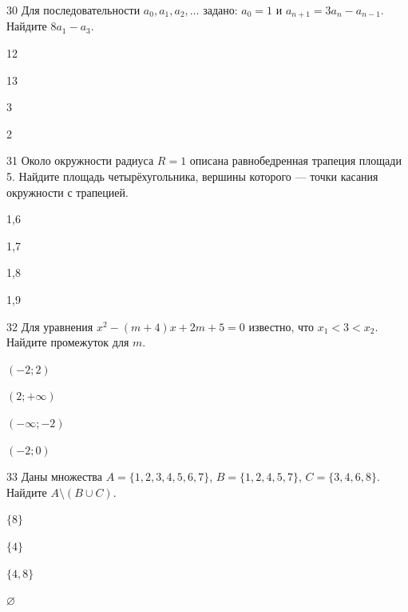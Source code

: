 \documentclass[14pt]{article}
\begin{document}
\begin{questionbox}{30}
    Для последовательности \(a_0, a_1, a_2, \dots\) задано: \(a_0 = 1\) и \(a_{n+1} = 3a_n-a_{n-1}\). Найдите \(8a_1 -a_{3}\).
    \begin{options}
        \item 12
        \item 13
        \item 3
        \item 2
    \end{options}
\end{questionbox}

\begin{questionbox}{31}
    Около окружности радиуса \(R=1\) описана равнобедренная трапеция площади 5. Найдите площадь четырёхугольника, вершины которого — точки касания окружности с трапецией.
    \begin{options}
        \item 1,6
        \item 1,7
        \item 1,8
        \item 1,9
    \end{options}
\end{questionbox}

\begin{questionbox}{32}
    Для уравнения \(x^2 - (m+4)x + 2m + 5 = 0\) известно, что \(x_1 < 3 < x_2\). Найдите промежуток для \(m\).
    \begin{options}
        \item \((-2; 2)\)
        \item \((2; +\infty)\)
        \item \((-\infty; -2)\)
        \item \((-2; 0)\)
    \end{options}
\end{questionbox}

\begin{questionbox}{33}
    Даны множества \(A = \{1,2,3,4,5,6,7\}\), \(B = \{1,2,4,5,7\}\), \(C = \{3,4,6,8\}\). Найдите \(A \setminus (B \cup C)\).
    \begin{options}
        \item \(\{8\}\)
        \item \(\{4\}\)
        \item \(\{4,8\}\)
        \item \(\varnothing\)
    \end{options}
\end{questionbox}
\end{document}
